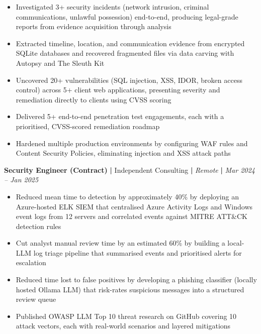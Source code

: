 \documentclass[letterpaper,11pt]{article}
\begin{document}
\begin{itemize}
  \item Investigated 3+ security incidents (network intrusion, criminal communications, unlawful
        possession) end-to-end, producing legal-grade reports from evidence acquisition through analysis
  \item Extracted timeline, location, and communication evidence from encrypted SQLite databases and
        recovered fragmented files via data carving with Autopsy and The Sleuth Kit
  \item Uncovered 20+ vulnerabilities (SQL injection, XSS, IDOR, broken access control) across 5+ client
        web applications, presenting severity and remediation directly to clients using CVSS scoring
  \item Delivered 5+ end-to-end penetration test engagements, each with a prioritised, CVSS-scored
        remediation roadmap
  \item Hardened multiple production environments by configuring WAF rules and Content Security
        Policies, eliminating injection and XSS attack paths
\end{itemize}

\noindent
\textbf{Security Engineer (Contract)} \textbf{|} Independent Consulting \textbf{|}
\textit{Remote} \textbf{|} \textit{Mar 2024 -- Jan 2025}

\begin{itemize}
  \item Reduced mean time to detection by approximately 40\% by deploying an Azure-hosted ELK SIEM
        that centralised Azure Activity Logs and Windows event logs from 12 servers and correlated
        events against MITRE ATT\&CK detection rules
  \item Cut analyst manual review time by an estimated 60\% by building a local-LLM log triage pipeline
        that summarised events and prioritised alerts for escalation
  \item Reduced time lost to false positives by developing a phishing classifier (locally hosted Ollama
        LLM) that risk-rates suspicious messages into a structured review queue
  \item Published OWASP LLM Top 10 threat research on GitHub covering 10 attack vectors, each with
        real-world scenarios and layered mitigations
\end{itemize}

\end{document}
